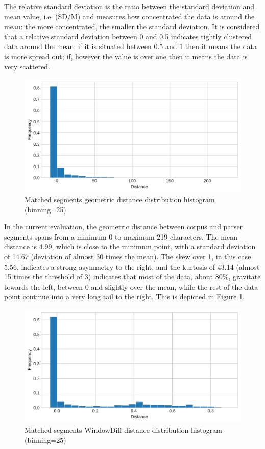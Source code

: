     The relative standard deviation is the ratio between the standard deviation and mean value, i.e. (SD/M) and measures how concentrated the data is around the mean: the more concentrated, the smaller the standard deviation. It is considered that a relative standard deviation between 0 and 0.5 indicates tightly clustered data around the mean; if it is situated between 0.5 and 1 then it means the data is more spread out; if, however the value is over one then it means the data is very scattered. 
    
    \begin{figure}[!ht]
    \centering
    \includegraphics[width=.85\textwidth]{evaluation-results/figures/distance-distribution-histogram-Geometric-25.pdf}
    \caption{Matched segments geometric distance distribution histogram (binning=25)}
    \label{fig:distance-distribution-histogram-Geometric-25}
    \end{figure}

    In the current evaluation, the geometric distance between corpus and parser segments spans from a minimum 0 to maximum 219 characters. The mean distance is 4.99, which is close to the minimum point, with a standard deviation of 14.67 (deviation of almost 30 times the mean). The skew over 1, in this case 5.56, indicates a strong asymmetry to the right, and the kurtosis of 43.14 (almost 15 times the threshold of 3) indicates that most of the data, about 80\%, gravitate towards the left, between 0 and slightly over the mean, while the rest of the data point continue into a very long tail to the right. This is depicted in Figure \ref{fig:distance-distribution-histogram-Geometric-25}. 
    
    \begin{figure}[!ht]
    \centering
    \includegraphics[width=.85\textwidth]{evaluation-results/figures/distance-distribution-histogram-WindowDiff-25.pdf}
    \caption{Matched segments WindowDiff distance distribution histogram (binning=25)}
    \label{fig:distance-distribution-histogram-WindowDiff-25}
    \end{figure}
    
